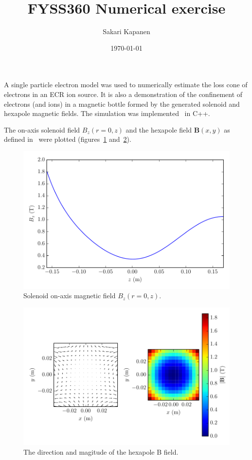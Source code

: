 \documentclass[12pt, a4paper]{article}
\begin{document}
\title{FYSS360 Numerical exercise}
\author{Sakari Kapanen}
\date{\today}
\maketitle

A single particle electron model was used to numerically estimate the loss cone of electrons in an ECR ion source. It is also a demonstration of the confinement of electrons (and ions) in a magnetic bottle formed by the generated solenoid and hexapole magnetic fields. The simulation was implemented~\cite{code} in \textsc{C++}.

The on-axis solenoid field $B_z(r=0, z)$ and the hexapole field $\mathbf{B}(x, y)$ as defined in~\cite{instr} were plotted (figures~\ref{fig:solenoidb} and~\ref{fig:hexapoleb}).
\begin{figure}[h]
    \centering
    \includegraphics{output/solenoid_B_onaxis.pdf}
    \caption{Solenoid on-axis magnetic field $B_z(r=0, z)$.}
    \label{fig:solenoidb}
\end{figure}
\begin{figure}[h]
    \centering
    \includegraphics{output/hexapole_B.pdf}
    \caption{The direction and magitude of the hexapole B field.}
    \label{fig:hexapoleb}
\end{figure}
\end{document}
